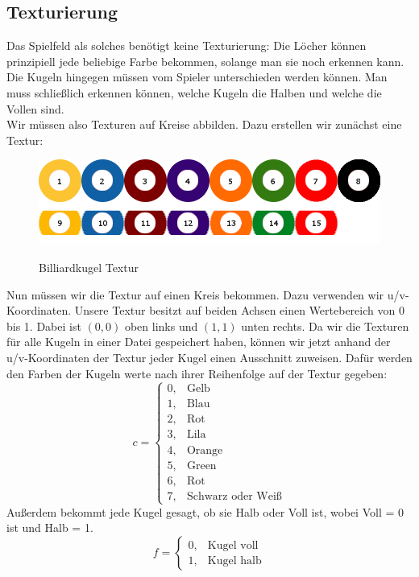 \subsection{Texturierung}
	Das Spielfeld als solches benötigt keine Texturierung: Die Löcher können prinzipiell jede beliebige Farbe bekommen, solange man sie noch erkennen kann. Die Kugeln hingegen müssen vom Spieler unterschieden werden können. Man muss schließlich erkennen können, welche Kugeln die Halben und welche die Vollen sind. \\
	Wir müssen also Texturen auf Kreise abbilden. Dazu erstellen wir zunächst eine Textur: \\ 
	\begin{figure}[h]
		\caption{Billiardkugel Textur}
			\includegraphics[width=\textwidth]{bilder/Balls.png} \\
	\end{figure}
	Nun müssen wir die Textur auf einen Kreis bekommen. Dazu verwenden wir u/v-Koordinaten. Unsere Textur besitzt auf beiden Achsen einen Wertebereich von 0 bis 1. Dabei ist $(0,0)$  oben links und $(1,1)$  unten rechts. Da wir die Texturen für alle Kugeln in einer Datei gespeichert haben, können wir jetzt anhand der u/v-Koordinaten der Textur jeder Kugel einen Ausschnitt zuweisen. Dafür werden den Farben der Kugeln werte nach ihrer Reihenfolge auf der Textur gegeben: \begin{equation}\label{eq:color}
	c = 
	\begin{cases}
		0, & \text{Gelb} \\
		1, & \text{Blau} \\
		2, & \text{Rot} \\
		3, & \text{Lila} \\
		4, & \text{Orange} \\
		5, & \text{Green} \\
		6, & \text{Rot} \\
		7, & \text{Schwarz oder Weiß}
	\end{cases}
	\end{equation} Außerdem bekommt jede Kugel gesagt, ob sie Halb oder Voll ist, wobei Voll = 0 ist und Halb = 1. \begin{equation} \label{eq:full}
	f = 
	\begin{cases}
		0, & \text{Kugel voll} \\
		1, & \text{Kugel halb}	
	\end{cases}
	\end{equation}\\
